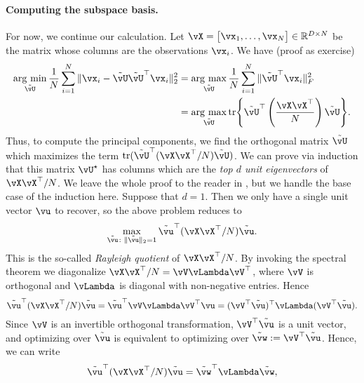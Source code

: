 \documentclass[\toplevelprefix/book-main.tex]{subfiles}
\begin{document}
\paragraph{Computing the subspace basis.}
For now, we continue our calculation. Let \(\vX = \mat{\vx_{1}, \dots, \vx_{N}} \in \R^{D \times N}\) be the matrix whose columns are the observations \(\vx_{i}\). We have (proof as exercise)
\begin{align}
    \argmin_{\tilde{\vU}}\frac{1}{N}\sum_{i = 1}^{N}\norm{\vx_{i} - \tilde{\vU}\tilde{\vU}^{\top}\vx_{i}}_{2}^{2}
    &= \argmax_{\tilde{\vU}}\frac{1}{N}\sum_{i = 1}^{N}\norm{\tilde{\vU}^{\top}\vx_{i}}_{F}^{2} \\ 
    &= \argmax_{\tilde{\vU}}\tr\rc{\tilde{\vU}^{\top}\bp{\frac{\vX\vX^{\top}}{N}}\tilde{\vU}}.
\end{align}
Thus, to compute the principal components, we find the orthogonal matrix
\(\tilde{\vU}\) which maximizes the term
\(\tr(\tilde{\vU}^{\top}(\vX\vX^{\top}/N)\tilde{\vU})\). We can prove via
induction that this matrix \(\vU^{\star}\) has columns which are the \textit{top \(d\) unit eigenvectors} of \(\vX\vX^{\top}/N\). We leave the whole proof to the reader in , but we handle the base case of the induction here. Suppose that \(d = 1\). Then we only have a single unit vector \(\vu\) to recover, so the above problem reduces to
\begin{equation}
    \max_{\tilde{\vu} \colon \norm{\tilde{\vu}}_{2} = 1} \tilde{\vu}^{\top}(\vX\vX^{\top}/N)\tilde{\vu}.
\end{equation}
This is the so-called \textit{Rayleigh quotient} of \(\vX\vX^{\top}/N\). By invoking the spectral theorem we diagonalize \(\vX\vX^{\top}/N = \vV\vLambda\vV^{\top}\), where \(\vV\) is orthogonal and \(\vLambda\) is diagonal with non-negative entries. Hence 
\begin{equation}
    \tilde{\vu}^{\top}(\vX\vX^{\top}/N)\tilde{\vu} = \tilde{\vu}^{\top}\vV\vLambda\vV^{\top}\vu = (\vV^{\top}\tilde{\vu})^{\top}\vLambda(\vV^{\top}\tilde{\vu}).
\end{equation}
Since \(\vV\) is an invertible orthogonal transformation, \(\vV^{\top}\tilde{\vu}\) is a unit vector, and optimizing over \(\tilde{\vu}\) is equivalent to optimizing over \(\tilde{\vw} := \vV^{\top}\tilde{\vu}\). Hence, we can write
\begin{equation}
    \tilde{\vu}^{\top}(\vX\vX^{\top}/N)\tilde{\vu} = \tilde{\vw}^{\top}\vLambda\tilde{\vw},
\end{equation}
\end{document}
